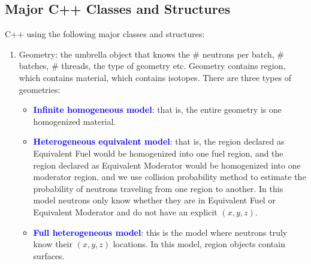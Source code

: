\documentclass[titlepage]{article}
\newcommand{\hi}[1]{\textbf{\textcolor{blue}{#1}}}
\begin{document}
\subsection{Major C++ Classes and Structures}
C++ using the following major classes and structures: 
\begin{enumerate}
\item Geometry: the umbrella object that knows the \# neutrons per batch, \# batches, \# threads, the type of geometry etc. Geometry contains region, which contains material, which contains isotopes. There are three types of geometries:
  \begin{itemize}
  \item \hi{Infinite homogeneous model}: that is, the entire geometry is one homogenized material. 
  \item \hi{Heterogeneous equivalent model}: that is, the region declared as Equivalent Fuel would be homogenized into one fuel region, and the region declared as Equivalent Moderator would be homogenized into one moderator region, and we use collision probability method to estimate the probability of neutrons traveling from one region to another. In this model neutrons only know whether they are in Equivalent Fuel or Equivalent Moderator and do not have an explicit $(x,y,z)$. 
  \item \hi{Full heterogeneous model}: this is the model where neutrons truly know their $(x,y,z)$ locations. In this model, region objects contain surfaces.
  \end{itemize}
  

\end{enumerate}
\end{document}
